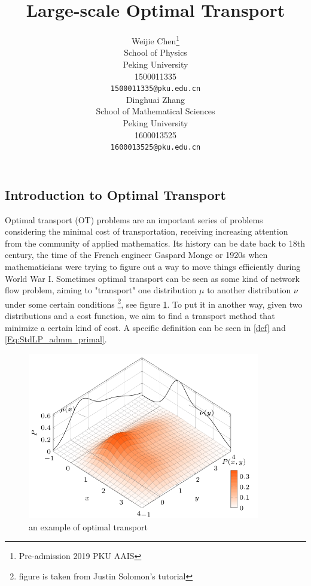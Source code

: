 \documentclass{article}
\title{Large-scale Optimal Transport}
\author{
  Weijie Chen\thanks{Pre-admission 2019 PKU AAIS} \\
  School of Physics\\
  Peking University\\
  1500011335 \\
  \texttt{1500011335@pku.edu.cn} \\
  \And
  Dinghuai Zhang \\
  School of Mathematical Sciences\\
  Peking University\\
  1600013525\\
  \texttt{1600013525@pku.edu.cn} \\
}
\begin{document}

\maketitle

%  

\begin{large}
\section{Introduction to Optimal Transport}
Optimal transport (OT) problems are an important series of problems considering the minimal cost of transportation, receiving increasing attention from the community of applied mathematics. Its history can be date back to 18th century, the time of the French engineer Gaspard Monge or 1920s when mathematicians were trying to figure out a way to move things efficiently during World War I. Sometimes optimal transport can be seen as some kind of network flow problem, aiming to "transport" one distribution $\mu$ to another distribution $\nu$ under some certain conditions \footnote{figure is taken from Justin Solomon's tutorial}, see figure \ref{fig:ot}. To put it in another way, given two distributions and a cost function, we aim to find a transport method that minimize a certain kind of cost. A specific definition can be seen in \ref{def} and \ref{Eq:StdLP_admm_primal}.

\begin{figure}[htbp] %
   \centering
   \includegraphics[width=4in]{ot.png} 
   \caption{an example of optimal transport}
   \label{fig:ot}
\end{figure}


\end{large}
\end{document}
